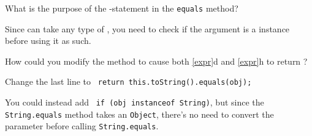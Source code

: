\Q What is the purpose of the -statement in the \texttt{equals} method?

\begin{answer}
Since  can take any type of , you need to check if the argument is a  instance before using it as such.
\end{answer}


\Q How could you modify the  method to cause both \ref{expr}d and \ref{expr}h to return ?

\begin{answer}[5em]
Change the last line to ~\texttt{return this.toString().equals(obj);}

You could instead add ~\texttt{if (obj instanceof String)}, but since the \texttt{String.equals} method takes an \texttt{Object}, there's no need to convert the  parameter before calling \texttt{String.equals}.
\end{answer}
